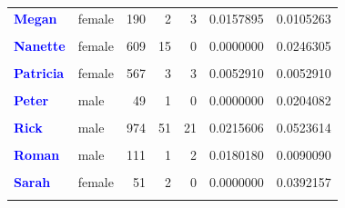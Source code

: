 \documentclass[
  man]{apa6}
\begin{document}
\begin{table}[!h]
\begin{tabular}[t]{>{}llrrrrr}
\addlinespace
\textcolor{blue}{\textbf{Megan}} & female & 190 & 2 & 3 & 0.0157895 & 0.0105263\\
\textcolor{blue}{\textbf{\cellcolor{gray!10}{Naima}}} & \cellcolor{gray!10}{female} & \cellcolor{gray!10}{36986} & \cellcolor{gray!10}{964} & \cellcolor{gray!10}{410} & \cellcolor{gray!10}{0.0110853} & \cellcolor{gray!10}{0.0260639}\\
\textcolor{blue}{\textbf{Nanette}} & female & 609 & 15 & 0 & 0.0000000 & 0.0246305\\
\textcolor{blue}{\textbf{\cellcolor{gray!10}{Nicole}}} & \cellcolor{gray!10}{female} & \cellcolor{gray!10}{100} & \cellcolor{gray!10}{10} & \cellcolor{gray!10}{0} & \cellcolor{gray!10}{0.0000000} & \cellcolor{gray!10}{0.1000000}\\
\textcolor{blue}{\textbf{Patricia}} & female & 567 & 3 & 3 & 0.0052910 & 0.0052910\\
\addlinespace
\textcolor{blue}{\textbf{\cellcolor{gray!10}{Patrick}}} & \cellcolor{gray!10}{male} & \cellcolor{gray!10}{8} & \cellcolor{gray!10}{1} & \cellcolor{gray!10}{0} & \cellcolor{gray!10}{0.0000000} & \cellcolor{gray!10}{0.1250000}\\
\textcolor{blue}{\textbf{Peter}} & male & 49 & 1 & 0 & 0.0000000 & 0.0204082\\
\textcolor{blue}{\textbf{\cellcolor{gray!10}{Richard}}} & \cellcolor{gray!10}{male} & \cellcolor{gray!10}{345} & \cellcolor{gray!10}{1} & \cellcolor{gray!10}{0} & \cellcolor{gray!10}{0.0000000} & \cellcolor{gray!10}{0.0028986}\\
\textcolor{blue}{\textbf{Rick}} & male & 974 & 51 & 21 & 0.0215606 & 0.0523614\\
\textcolor{blue}{\textbf{\cellcolor{gray!10}{Robert}}} & \cellcolor{gray!10}{male} & \cellcolor{gray!10}{56} & \cellcolor{gray!10}{1} & \cellcolor{gray!10}{0} & \cellcolor{gray!10}{0.0000000} & \cellcolor{gray!10}{0.0178571}\\
\addlinespace
\textcolor{blue}{\textbf{Roman}} & male & 111 & 1 & 2 & 0.0180180 & 0.0090090\\
\textcolor{blue}{\textbf{\cellcolor{gray!10}{Ronny}}} & \cellcolor{gray!10}{male} & \cellcolor{gray!10}{721} & \cellcolor{gray!10}{46} & \cellcolor{gray!10}{47} & \cellcolor{gray!10}{0.0651872} & \cellcolor{gray!10}{0.0638003}\\
\textcolor{blue}{\textbf{Sarah}} & female & 51 & 2 & 0 & 0.0000000 & 0.0392157\\
\textcolor{blue}{\textbf{\cellcolor{gray!10}{Scott}}} & \cellcolor{gray!10}{male} & \cellcolor{gray!10}{91} & \cellcolor{gray!10}{0} & \cellcolor{gray!10}{0} & \cellcolor{gray!10}{0.0000000} & \cellcolor{gray!10}{0.0000000}\\

\end{tabular}
\end{table}
\end{document}
